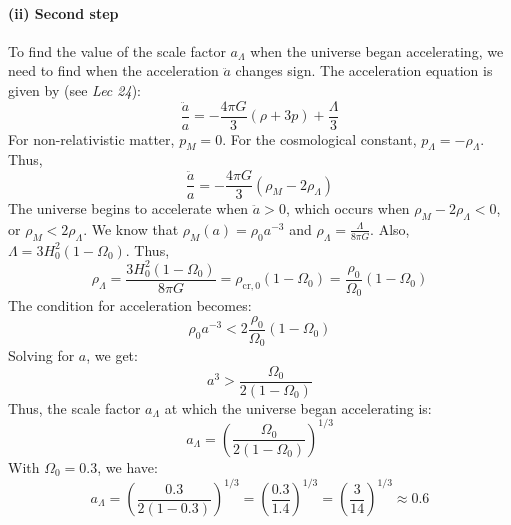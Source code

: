 \documentclass{article}
\begin{document}
\paragraph{(ii) Second step}
To find the value of the scale factor $a_\Lambda$ when the universe began accelerating, we need to find when the acceleration $\ddot{a}$ changes sign. The acceleration equation is given by (see \emph{Lec 24}):
\begin{equation}
\frac{\ddot{a}}{a} = -\frac{4\pi G}{3} (\rho + 3p) + \frac{\Lambda}{3}
\end{equation}
For non-relativistic matter, $p_M = 0$. For the cosmological constant, $p_\Lambda = -\rho_\Lambda$. Thus,
\begin{equation}
\frac{\ddot{a}}{a} = -\frac{4\pi G}{3} (\rho_M - 2\rho_\Lambda)
\end{equation}
The universe begins to accelerate when $\ddot{a} > 0$, which occurs when $\rho_M - 2\rho_\Lambda < 0$, or $\rho_M < 2\rho_\Lambda$.
We know that $\rho_M(a) = \rho_0 a^{-3}$ and $\rho_\Lambda = \frac{\Lambda}{8\pi G}$. Also, $\Lambda = 3H_0^2(1-\Omega_0)$. Thus,
\begin{equation}
\rho_\Lambda = \frac{3H_0^2(1-\Omega_0)}{8\pi G} = \rho_{\text{cr},0} (1-\Omega_0) = \frac{\rho_0}{\Omega_0} (1-\Omega_0)
\end{equation}
The condition for acceleration becomes:
\begin{equation}
\rho_0 a^{-3} < 2 \frac{\rho_0}{\Omega_0} (1-\Omega_0)
\end{equation}
Solving for $a$, we get:
\begin{equation}
a^3 > \frac{\Omega_0}{2(1-\Omega_0)}
\end{equation}
Thus, the scale factor $a_\Lambda$ at which the universe began accelerating is:
\begin{equation}
a_\Lambda = \left( \frac{\Omega_0}{2(1-\Omega_0)} \right)^{1/3}
\end{equation}
With $\Omega_0 = 0.3$, we have:
\begin{equation}
a_\Lambda = \left( \frac{0.3}{2(1-0.3)} \right)^{1/3} = \left( \frac{0.3}{1.4} \right)^{1/3} = \left( \frac{3}{14} \right)^{1/3} \approx 0.6
\end{equation}
\end{document}
